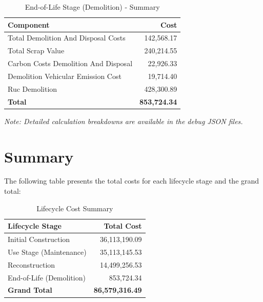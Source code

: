 \documentclass[12pt,a4paper]{article}
\begin{document}
\begin{table}[H]
\centering
\begin{tabular}{lr}
\toprule
\textbf{Component} & \textbf{Cost} \\
\midrule
Total Demolition And Disposal Costs & 142,568.17 \\
Total Scrap Value & 240,214.55 \\
Carbon Costs Demolition And Disposal & 22,926.33 \\
Demolition Vehicular Emission Cost & 19,714.40 \\
Ruc Demolition & 428,300.89 \\
\midrule
\textbf{Total} & \textbf{853,724.34} \\
\bottomrule
\end{tabular}
\caption{End-of-Life Stage (Demolition) - Summary}
\end{table}

\textit{Note: Detailed calculation breakdowns are available in the debug JSON files.}

\section{Summary}

The following table presents the total costs for each lifecycle stage and the grand total:

\begin{table}[H]
\centering
\begin{tabular}{lr}
\toprule
\textbf{Lifecycle Stage} & \textbf{Total Cost} \\
\midrule
Initial Construction & 36,113,190.09 \\
Use Stage (Maintenance) & 35,113,145.53 \\
Reconstruction & 14,499,256.53 \\
End-of-Life (Demolition) & 853,724.34 \\
\midrule
\textbf{Grand Total} & \textbf{86,579,316.49} \\
\bottomrule
\end{tabular}
\caption{Lifecycle Cost Summary}
\end{table}
\end{document}
